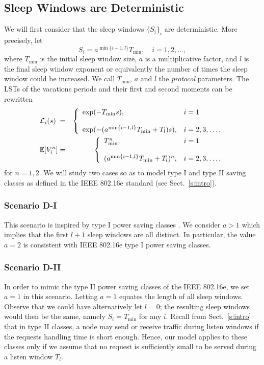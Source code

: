 \documentclass[journal]{IEEEtran}
\newcommand {\barr} {\begin{array}}
\newcommand {\earr} {\end{array}}
\newcommand {\bears} {\begin{eqnarray*}}
\newcommand {\eears} {\end{eqnarray*}}
\def \E{{\mathbb E}}
\begin{document}
\subsection{Sleep Windows are Deterministic}
\label{s:S-const}
We will first consider that the sleep windows $\{S_i\}_i$ are deterministic. More precisely, let
\[
S_i=a^{\min\{i-1,l\} }T_{\min},\quad i=1,2,\ldots,
\]
where $T_{\min}$ is the initial sleep window size, $a$ is a multiplicative factor, and $l$ is the final sleep window exponent or equivalently the number of times the sleep window could be increased. We call $T_{\min}$, $a$ and $l$ the {\em protocol} parameters. The LSTs of the vacations periods and their first and second moments can be rewritten
\bears
{\cal L}_i(s)\;&=&\left\{
\barr{ll}
\exp(-T_{\min}s) , & i=1\\
&\\
\exp(-(a^{\min\{i-1,l\}}T_{\min}+T_l)s) , & i=2,3,\ldots,\\
\earr\right.\\
\E[V_i^n]&=&\left\{
\barr{ll}
T_{\min}^n , & i=1\\
&\\
(a^{\min\{i-1,l\}}T_{\min}+T_l)^n , & i=2,3,\ldots,\\
\earr\right.
\eears
for $n=1,2$.
We will study two cases so as to model type I and type
II saving classes as defined in the IEEE 802.16e standard (see
Sect.~\ref{s:intro}).
\subsubsection*{Scenario D-I}
This scenario is inspired by type I power saving classes \cite{man}. We consider
$a>1$ which implies that the first $l+1$ sleep windows are all
distinct. In particular, the value $a=2$ is consistent with IEEE
802.16e type I power saving classes.
\subsubsection*{Scenario D-II}
In order to mimic the type II power saving classes of the IEEE
802.16e, we set $a=1$ in this scenario. Letting $a=1$
equates the length of all sleep windows. Observe that we could have
alternatively let $l=0$; the resulting sleep windows would then be the
same, namely $S_i=T_{\min}$ for any $i$.
Recall from Sect.~\ref{s:intro} that in type II classes, a node may
send or receive traffic during listen windows if the requests
handling time is short enough. Hence, our model applies to these
classes only if we assume that no request is sufficiently small to be
served during a listen window $T_l$.
\end{document}
